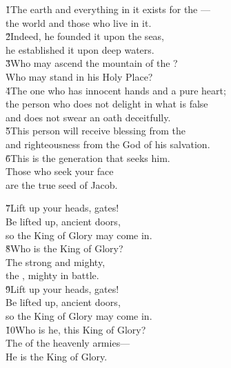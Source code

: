 \begin{poetry}
\poeml \v{1}The earth and everything in it exists for the --- \\
\poemll    the world and those who live in it. \\
\poeml \v{2}Indeed, he founded it upon the seas, \\
\poemll    he established it upon deep waters. \\
\poeml \v{3}Who may ascend the mountain of the ? \\
\poemll    Who may stand in his Holy Place? \\
\poeml \v{4}The one who has innocent hands and a pure heart; \\
\poemll    the person who does not delight in what is false \\
\poemlll       and does not swear an oath deceitfully. \\
\poeml \v{5}This person will receive blessing from the  \\
\poemll    and righteousness from the God of his salvation. \\
\poeml \v{6}This is the generation that seeks him. \\
\poemll    Those who seek your face \\
\poemlll       are the true seed of Jacob.
\end{poetry}

\begin{poetry}
\poeml \v{7}Lift up your heads, gates! \\
\poemll    Be lifted up, ancient doors, \\
\poemlll       so the King of Glory may come in. \\
\poeml \v{8}Who is the King of Glory? \\
\poemll    The  strong and mighty, \\
\poemlll       the , mighty in battle. \\
\poeml \v{9}Lift up your heads, gates! \\
\poemll    Be lifted up, ancient doors, \\
\poemlll       so the King of Glory may come in. \\
\poeml \v{10}Who is he, this King of Glory? \\
\poemll    The  of the heavenly armies--- \\
\poemlll       He is the King of Glory.
\end{poetry}

